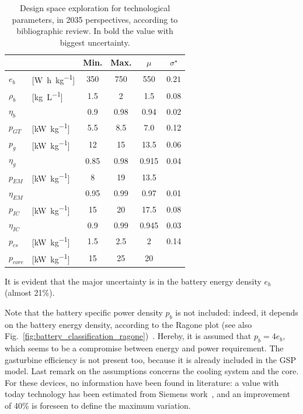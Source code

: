 \begin{table}[!h]
	\centering
	\begin{tabular}{l l c c c c}
		\cline{3-6}
		&  & \textbf{Min.} & \textbf{Max.} & $\mu$ & $\sigma^\star$ \\
		\hline
		$e_b$ & [\si{\watt\hour\per\kilogram}] & 350 & 750 & 550 & $\mathbf{0.21}$ \\
		$\rho_b$ & [\si{\kilogram\per\liter}] & 1.5 & 2 & 1.5 & 0.08 \\
		$\eta_b$ & & 0.9 & 0.98&0.94&0.02 \\
		
		$p_{GT}$ & [\si{\kilo\watt\per\kilogram}] & 5.5 & 8.5 & 7.0 & 0.12 \\
		$p_g$ & [\si{\kilo\watt\per\kilogram}]  & 12 & 15 & 13.5 & 0.06 \\
		$\eta_g$ & & 0.85 & 0.98&0.915&0.04\\		
		
		$p_{EM}$ & [\si{\kilo\watt\per\kilogram}] & 8 & 19 & 13.5 & \\
		$\eta_{EM}$ & & 0.95 & 0.99 & 0.97 & 0.01 \\		
		
		$p_{IC}$ & [\si{\kilo\watt\per\kilogram}] & 15 & 20 & 17.5 & 0.08 \\
		$\eta_{IC}$ & & 0.9 & 0.99 & 0.945 & 0.03 \\		
		
		$p_{cs}$ & [\si{\kilo\watt\per\kilogram}] & 1.5 & 2.5 & 2 & 0.14 \\
		
		$p_{core}$ & [\si{\kilo\watt\per\kilogram}] & 15 & 25 & 20 &  \\	
		\hline	
	\end{tabular}
	\caption{Design space exploration for technological parameters, in 2035 perspectives, according to bibliographic review. In bold the value with biggest uncertainty.}
	\label{tab:techno_design_space}
\end{table}
It is evident that the major uncertainty is in the battery energy density $e_b$ (almost 21\%).   

Note that the battery specific power density $p_b$ is not included: indeed, it depends on the battery energy density, according to the Ragone plot (see also Fig.~\ref{fig:battery_classification_ragone})~\cite{bib:ragone}. 
Hereby, it is assumed that $p_b=4e_b$, which seems to be a compromise between energy and power requirement.
The gasturbine efficiency is not present too, because it is already included in the GSP model. 
Last remark on the assumptions concerns the cooling system and the core. 
For these devices, no information have been found in literature: a value with today technology has been estimated from Siemens work~\cite{bib:anton}, and an improvement of 40\% is foreseen to define the maximum variation.  

